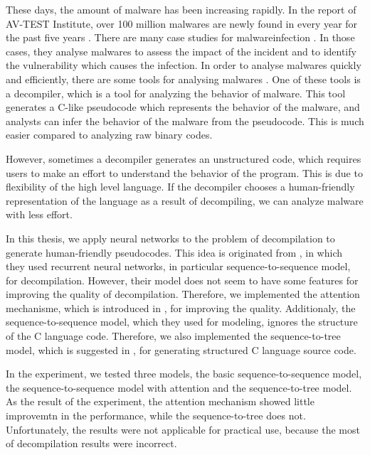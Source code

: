\documentclass[senior,final,11pt]{iscs-thesis}
\begin{document}
These days, the amount of malware has been increasing rapidly. In the report of AV-TEST Institute,
over 100 million malwares are newly found in every year for the past five years \citep{malware_increase}.
There are many case studies for malwareinfection \citep{malware_case_1,malware_case_2,malware_case_3,malware_case_4}.
In those cases, they analyse malwares to assess the impact of the incident and to identify the vulnerability which causes the infection.
In order to analyse malwares quickly and efficiently, there are some tools for analysing malwares \citep{mal_anal_tool}.
One of these tools is a decompiler, which is a tool for analyzing the behavior of malware. 
This tool generates a C-like pseudocode which represents the behavior of the malware, and analysts can infer the behavior of the malware from the pseudocode.
This is much easier compared to analyzing raw binary codes.

However, sometimes a decompiler generates an unstructured code, which requires users to make an effort to understand the behavior of the program. 
This is due to flexibility of the high level language. If the decompiler chooses a human-friendly representation of the language as a result of decompiling, we can analyze malware with less effort. 

In this thesis, we apply neural networks to the problem of decompilation to generate human-friendly pseudocodes. 
This idea is originated from \cite{Motoneta}, in which they used recurrent neural networks, in particular sequence-to-sequence model, for decompilation.
However, their model does not seem to have some features for improving the quality of decompilation.
Therefore, we implemented the attention mechanisme, which is introduced in \cite{dot_attention}, for improving the quality.
Additionaly, the sequence-to-sequence model, which they used for modeling, ignores the structure of the C language code.
Therefore, we also implemented the sequence-to-tree model, which is suggested in \cite{Seq2Tree}, for generating structured C language source code.

In the experiment, we tested three models, the basic sequence-to-sequence model, the sequence-to-sequence model with attention and the sequence-to-tree model.
As the result of the experiment, the attention mechanism showed little improvemtn in the performance, while the sequence-to-tree does not.
Unfortunately, the results were not applicable for practical use, because the most of decompilation results were incorrect.
\end{document}
